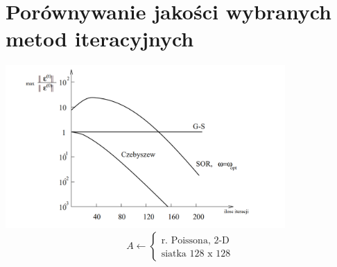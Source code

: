 \section{Porównywanie jakości wybranych metod iteracyjnych}

\begin{frame}
  \includegraphics[height=0.5\textheight, width=0.8\textwidth]{img/12/iteracja4}
  $$
  A\leftarrow
  \begin{cases}
    \text{r. Poissona, 2-D}\\
    \text{siatka 128 x 128}
  \end{cases}
  $$
\end{frame}
